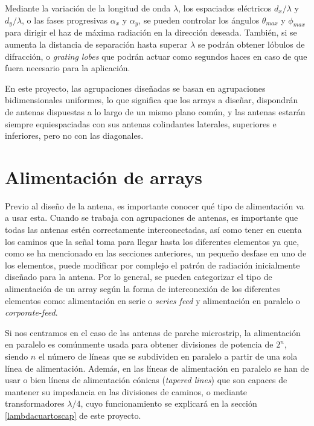 \par Mediante la variación de la longitud de onda $\lambda$, los espaciados eléctricos $d_{x}/\lambda$ y $d_{y}/\lambda$, o las fases progresivas $\alpha_{x}$ y $\alpha_{y}$, se pueden controlar los ángulos $\theta_{max}$ y $\phi_{max}$ para dirigir el haz de máxima radiación en la dirección deseada. También, si se aumenta la distancia de separación hasta superar $\lambda$ se podrán obtener lóbulos de difracción, o \textit{grating lobes} que podrán actuar como segundos haces en caso de que fuera necesario para la aplicación.
\\
\par En este proyecto, las agrupaciones diseñadas se basan en agrupaciones bidimensionales uniformes, lo que significa que los arrays a diseñar, dispondrán de antenas dispuestas a lo largo de un mismo plano común, y las antenas estarán siempre equiespaciadas con sus antenas colindantes laterales, superiores e inferiores, pero no con las diagonales. 

\section{Alimentación de arrays}
\par Previo al diseño de la antena, es importante conocer qué tipo de alimentación va a usar esta. Cuando se trabaja con agrupaciones de antenas, es importante que todas las antenas estén correctamente interconectadas, así como tener en cuenta los caminos que la señal toma para llegar hasta los diferentes elementos ya que, como se ha mencionado en las secciones anteriores, un pequeño desfase en uno de los elementos, puede modificar por complejo el patrón de radiación inicialmente diseñado para la antena. Por lo general, se pueden categorizar el tipo de alimentación de un array según la forma de interconexión de los diferentes elementos como: alimentación en serie o \textit{series feed} y alimentación en paralelo o \textit{corporate-feed}. 
\\
\par Si nos centramos en el caso de las antenas de parche microstrip, la alimentación en paralelo es comúnmente usada para obtener divisiones de potencia de $2^{n}$, siendo $n$ el número de líneas que se subdividen en paralelo a partir de una sola línea de alimentación. Además, en las líneas de alimentación en paralelo se han de usar o bien líneas de alimentación cónicas (\textit{tapered lines}) que son capaces de mantener su impedancia en las divisiones de caminos, o mediante transformadores $\lambda/4$, cuyo funcionamiento se explicará en la sección \ref{lambdacuartoscap} de este proyecto. \cite{Balanis2015}

